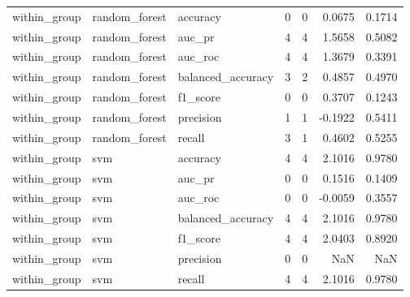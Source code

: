 \begin{tabular}{lllllrr}
within_group & random_forest & accuracy & 0 & 0 & 0.0675 & 0.1714 \\
within_group & random_forest & auc_pr & 4 & 4 & 1.5658 & 0.5082 \\
within_group & random_forest & auc_roc & 4 & 4 & 1.3679 & 0.3391 \\
within_group & random_forest & balanced_accuracy & 3 & 2 & 0.4857 & 0.4970 \\
within_group & random_forest & f1_score & 0 & 0 & 0.3707 & 0.1243 \\
within_group & random_forest & precision & 1 & 1 & -0.1922 & 0.5411 \\
within_group & random_forest & recall & 3 & 1 & 0.4602 & 0.5255 \\
within_group & svm & accuracy & 4 & 4 & 2.1016 & 0.9780 \\
within_group & svm & auc_pr & 0 & 0 & 0.1516 & 0.1409 \\
within_group & svm & auc_roc & 0 & 0 & -0.0059 & 0.3557 \\
within_group & svm & balanced_accuracy & 4 & 4 & 2.1016 & 0.9780 \\
within_group & svm & f1_score & 4 & 4 & 2.0403 & 0.8920 \\
within_group & svm & precision & 0 & 0 & NaN & NaN \\
within_group & svm & recall & 4 & 4 & 2.1016 & 0.9780 \\
\bottomrule
\end{tabular}
